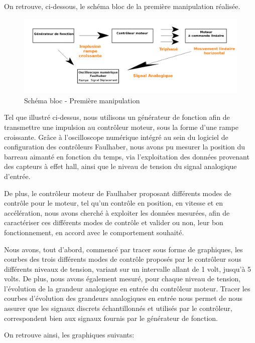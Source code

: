 \documentclass[french,a4paper,12pt]{report}
\begin{document}
	On retrouve, ci-dessous, le schéma bloc de la première manipulation réalisée.
		
	\begin{figure}[!ht]
    \center
  	\includegraphics[width=18cm]{manip1.png}
    \caption{Schéma bloc - Première manipulation}
	\end{figure}	
		
		Tel que illustré ci-dessus, nous utilisons un générateur de fonction afin de transmettre une impulsion au contrôleur moteur, sous la forme d'une rampe croissante.
		Grâce à l'oscilloscope numérique intégré au sein du logiciel de configuration des contrôleurs Faulhaber, nous avons pu mesurer la position du barreau aimanté en fonction du temps, via l'exploitation des données provenant des capteurs à effet hall, ainsi que le niveau de tension du signal analogique d'entrée.
		
		De plus, le contrôleur moteur de Faulhaber proposant différents modes de contrôle pour le moteur, tel qu'un contrôle en position, en vitesse et en accélération, nous avons cherché à exploiter les données mesurées, afin de caractériser ces différents modes de contrôle et valider ou non, leur bon fonctionnement, en accord avec le comportement souhaité.
		
		Nous avons, tout d'abord, commencé par tracer sous forme de graphiques, les courbes des trois différents modes de contrôle proposés par le contrôleur sous différents niveaux de tension, variant sur un intervalle allant de 1 volt, jusqu'à 5 volts.
		De plus, nous avons également mesuré, pour chaque niveau de tension, l'évolution de la grandeur analogique en entrée du contrôleur moteur. Tracer les courbes d'évolution des grandeurs analogiques en entrée nous permet de nous assurer que les signaux discrets échantillonnés et utilisés par le contrôleur, correspondent bien aux signaux fournis par le générateur de fonction.
		
		On retrouve ainsi, les graphiques suivants:
		
\end{document}
